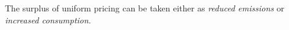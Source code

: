 \documentclass[12pt,english]{article}
\theoremstyle{remark}
\begin{document}
\begin{table}[!ht]
\begin{minipage}{\textwidth}
The surplus of uniform pricing can be taken either as \emph{reduced emissions} or \emph{increased consumption}. 
\end{minipage}
\end{table}
\FloatBarrier   %
\end{document}
